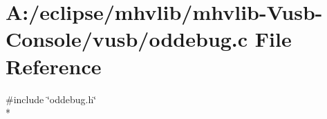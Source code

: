 \hypertarget{mhvlib-_vusb-_console_2vusb_2oddebug_8c}{\section{A\-:/eclipse/mhvlib/mhvlib-\/\-Vusb-\/\-Console/vusb/oddebug.c File Reference}
\label{mhvlib-_vusb-_console_2vusb_2oddebug_8c}
}
{\ttfamily \#include \char`\"{}oddebug.\-h\char`\"{}}\\*
